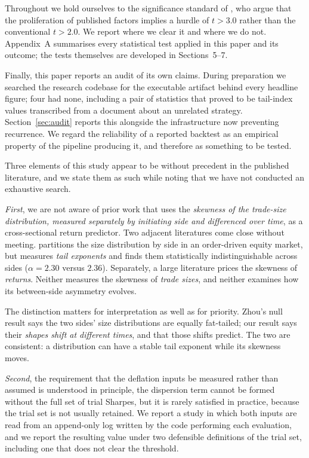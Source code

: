 \documentclass[11pt,letterpaper]{article}
\begin{document}
Throughout we hold ourselves to the significance standard of \citet{harvey2016},
who argue that the proliferation of published factors implies a hurdle of $t>3.0$
rather than the conventional $t>2.0$. We report where we clear it and where we do
not. Appendix~A summarises every statistical test applied in this
paper and its outcome; the tests themselves are developed in Sections~5--7.


Finally, this paper reports an audit of its own claims. During preparation we
searched the research codebase for the executable artifact behind every headline
figure; four had none, including a pair of statistics that proved to be
tail-index values transcribed from a document about an unrelated strategy.
Section~\ref{sec:audit} reports this alongside the infrastructure now preventing
recurrence. We regard the reliability of a reported backtest as an empirical
property of the pipeline producing it, and therefore as something to be tested.

Three elements of this study appear to be without precedent in the published
literature, and we state them as such while noting that we have not conducted an
exhaustive search.

\emph{First}, we are not aware of prior work that uses the \emph{skewness of the
trade-size distribution, measured separately by initiating side and differenced
over time}, as a cross-sectional return predictor. Two adjacent literatures come
close without meeting. \citet{zhou2008} partitions the size distribution by side
in an order-driven equity market, but measures \emph{tail exponents} and finds
them statistically indistinguishable across sides ($\alpha=2.30$ versus $2.36$).
Separately, a large literature prices the skewness of \emph{returns}. Neither
measures the skewness of \emph{trade sizes}, and neither examines how its
between-side asymmetry evolves.

The distinction matters for interpretation as well as for priority. Zhou's null
result says the two sides' size distributions are equally fat-tailed; our result
says their \emph{shapes shift at different times}, and that those shifts predict.
The two are consistent: a distribution can have a stable tail exponent while its
skewness moves.

\emph{Second}, the requirement that the deflation inputs be measured rather than
assumed is understood in principle, the dispersion term cannot be formed without
the full set of trial Sharpes, but it is rarely satisfied in practice, because
the trial set is not usually retained. We report a study in which both inputs are
read from an append-only log written by the code performing each evaluation, and
we report the resulting value under two defensible definitions of the trial set,
including one that does not clear the threshold.
\end{document}
